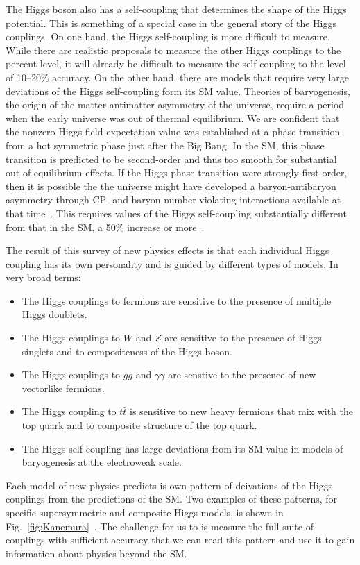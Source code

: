 \documentclass[12pt]{article}
\begin{document}
The Higgs boson also has a self-coupling that determines the shape of
the Higgs potential.   This is something of a special case in the general
story of the Higgs couplings. 
 On one hand, the Higgs self-coupling is more difficult to
measure.  While there are realistic proposals to measure the other
Higgs couplings to the percent level, it will already be difficult to
measure the self-coupling to the level of 10--20\%  accuracy.  On the
other hand, there are models that require very large deviations of the
Higgs self-coupling form its SM value.   Theories of baryogenesis, the
origin of the matter-antimatter asymmetry of the universe, require a
period when the early universe was out of thermal equilibrium.  We are 
confident that the nonzero Higgs field expectation value was
established at a phase transition from a hot symmetric phase just
after the Big Bang.   In the SM, this phase transition is predicted to
be second-order and thus too smooth for substantial out-of-equilibrium
effects.    If the Higgs phase transition were strongly first-order,
then it is possible the the universe might have developed a
baryon-antibaryon asymmetry through CP- and baryon number violating
interactions available at that time~\cite{EWbaryoreview}.  This
requires values of the Higgs self-coupling substantially different
from that in the SM, a 50\% increase or more~\cite{NoblePerelstein}.

The result of this survey of new physics effects is that each
individual Higgs coupling has its own personality and is guided by
different types of models.   In very broad terms:
\begin{itemize}
\item The Higgs couplings to fermions are sensitive to the presence of
  multiple Higgs doublets.
\item The Higgs couplings to $W$ and $Z$ are sensitive to the presence
  of Higgs singlets and to compositeness of the Higgs boson.
\item The Higgs couplings to $gg$ and $\gamma\gamma$ are senstive to
  the presence of new vectorlike fermions.
\item The Higgs coupling to $t\bar t$ is sensitive to new heavy
  fermions that mix with the top quark and to composite structure of
  the top quark.
\item The Higgs self-coupling  has large deviations from its SM
  value in models of baryogenesis at the electroweak scale.
\end{itemize}
Each model of new physics predicts is own pattern of deivations of the
Higgs couplings from the predictions of the SM.  Two examples of these
patterns, for specific supersymmetric and composite Higgs models, is 
shown in Fig.~\ref{fig:Kanemura}~\cite{Kanemura}. The challenge for us
to is measure the full suite of couplings with sufficient accuracy
that we can read this pattern and use it to gain information about
physics beyond the SM.
\end{document}
